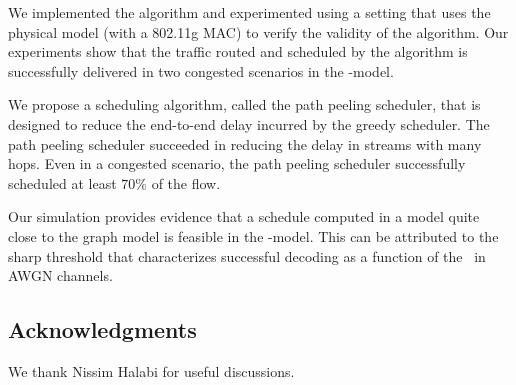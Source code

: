 \documentclass[12pt]{article}
\newenvironment{proof sketch}[1]{\noindent {\emph{Proof sketch of #1:}}}{\hfill \qed}
\newcommand{\SINR}{\text{\sc{sinr}}}
\begin{document}
We implemented the algorithm and experimented using a setting that
uses the physical model (with a 802.11g MAC) to verify the validity of the algorithm.  Our
experiments show that the traffic routed and scheduled by the
algorithm is successfully delivered in two congested scenarios in the
\SINR-model.

We propose a scheduling algorithm, called the path peeling scheduler,
that is designed to reduce the end-to-end delay incurred by the greedy
scheduler. The path peeling scheduler succeeded in reducing the delay
in streams with many hops. Even in a congested scenario, the path
peeling scheduler successfully scheduled at least $70\%$ of the flow.

Our simulation provides evidence that a schedule computed in a model
quite close to the graph model is feasible in the \SINR-model.  This
can be attributed to the sharp threshold that characterizes successful
decoding as a function of the \SINR\ in AWGN channels.

%
\ifnum{}
  \subsection*{Acknowledgments}
  We thank Nissim Halabi for useful discussions.
\fi
%




\newpage
\appendix
\end{document}
